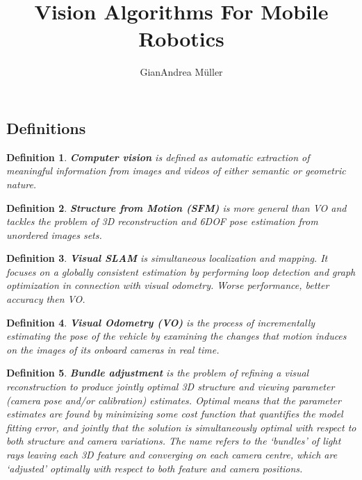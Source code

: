\documentclass[10pt,a4paper]{scrartcl}
\title{Vision Algorithms For Mobile Robotics}
\author{GianAndrea Müller}
\newtheorem{define}{Definition}
\begin{document}
\begin{multicols*}{4}
\maketitle
\tableofcontents
\end{multicols*}

\begin{multicols*}{2}

\section{Definitions}

\begin{define}
\textbf{Computer vision} is defined as automatic extraction of meaningful information from images and videos of either semantic or geometric nature.
\end{define}

\begin{define}
\textbf{Structure from Motion (SFM)} is more general than VO and tackles the problem of 3D reconstruction and 6DOF pose estimation from unordered images sets.
\end{define}

\begin{define}
\textbf{Visual SLAM} is simultaneous localization and mapping. It focuses on a globally consistent estimation by performing loop detection and graph optimization in connection with visual odometry. Worse performance, better accuracy then VO.

\end{define}

\begin{define}
\textbf{Visual Odometry (VO)} is the process of incrementally estimating the pose of the vehicle by examining the changes that motion induces on the images of its onboard cameras in real time.
\end{define}

\begin{define}
\textbf{Bundle adjustment} is the problem of refining a visual reconstruction to produce jointly optimal
3D structure and viewing parameter (camera pose and/or calibration) estimates. Optimal means that the parameter estimates are found by minimizing some cost function that quantifies the model fitting
error, and jointly that the solution is simultaneously optimal with respect to both structure and camera
variations. The name refers to the ‘bundles’ of light rays leaving each 3D feature and converging on
each camera centre, which are ‘adjusted’ optimally with respect to both feature and camera positions.
\end{define}


\end{multicols*}
\end{document}
